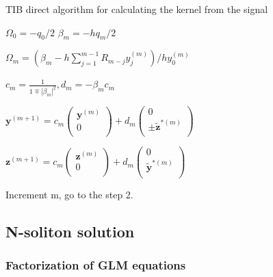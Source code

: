 \begin{algorithm}
    \caption{TIB direct algorithm for calculating the kernel from the signal}
\label{alg:dtib}
\begin{algorithmic}[1]

	\State $ \Omega_0 = -q_0 / 2$ 
	\State $ \beta_m = -h q_m / 2$

	\State $ \Omega_m = \left( \beta_m - h \sum_{j=1}^{m-1} R_{m-j} y_{j}^{(m)} \right) / h y_0^{(m)} $


	\State $c_m = \frac{1}{1 \mp |\beta_m|^2}, d_m = -\beta_m c_m$

	\State $\mathbf y^{(m+1)} = 
		c_m \begin{pmatrix} \mathbf y^{(m)} \\ 0 \\ \end{pmatrix} +
		d_m \begin{pmatrix} 0 \\ \pm \mathbf{\tilde z}^{*(m)} \\ \end{pmatrix}$

	\State $\mathbf z^{(m+1)} = 
		c_m \begin{pmatrix} \mathbf z^{(m)} \\ 0 \\ \end{pmatrix} +
		d_m \begin{pmatrix} 0 \\ \mathbf{ \tilde y}^{*(m)} \\ \end{pmatrix}$

	\State Increment m, go to the step 2.

\end{algorithmic}
\end{algorithm}


\subsection{N-soliton solution}

\subsubsection{Factorization of GLM equations}

